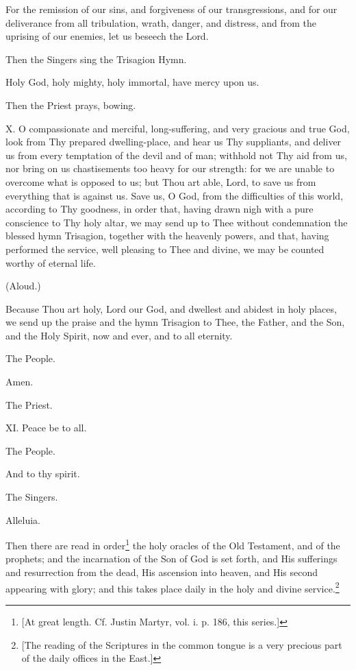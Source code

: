 For the remission of our sins, and forgiveness of our transgressions, and for our deliverance from all tribulation, wrath, danger, and distress, and from the uprising of our enemies, let us beseech the Lord.

Then the Singers sing the Trisagion Hymn.

Holy God, holy mighty, holy immortal, have mercy upon us.

Then the Priest prays, bowing.

X. O compassionate and merciful, long-suffering, and very gracious and true God, look from Thy prepared dwelling-place, and hear us Thy suppliants, and deliver us from every temptation of the devil and of man; withhold not Thy aid from us, nor bring on us chastisements too heavy for our strength: for we are unable to overcome what is opposed to us; but Thou art able, Lord, to save us from everything that is against us. Save us, O God, from the difficulties of this world, according to Thy goodness, in order that, having drawn nigh with a pure conscience to Thy holy altar, we may send up to Thee without condemnation the blessed hymn Trisagion, together with the heavenly powers, and that, having performed the service, well pleasing to Thee and divine, we may be counted worthy of eternal life.

(Aloud.)

Because Thou art holy, Lord our God, and dwellest and abidest in holy places, we send up the praise and the hymn Trisagion to Thee, the Father, and the Son, and the Holy Spirit, now and ever, and to all eternity.

The People.

Amen.

The Priest.

XI. Peace be to all.

The People.

And to thy spirit.

The Singers.

Alleluia.

Then there are read in order\footnote{\par{}  [At great length. Cf. Justin Martyr, vol. i. p. 186, this series.]} the holy oracles of the Old Testament, and of the prophets; and the incarnation of the Son of God is set forth, and His sufferings and resurrection from the dead, His ascension into heaven, and His second appearing with glory; and this takes place daily in the holy and divine service.\footnote{\par{}  [The reading of the Scriptures in the common tongue is a very precious part of the daily offices in the East.]}

